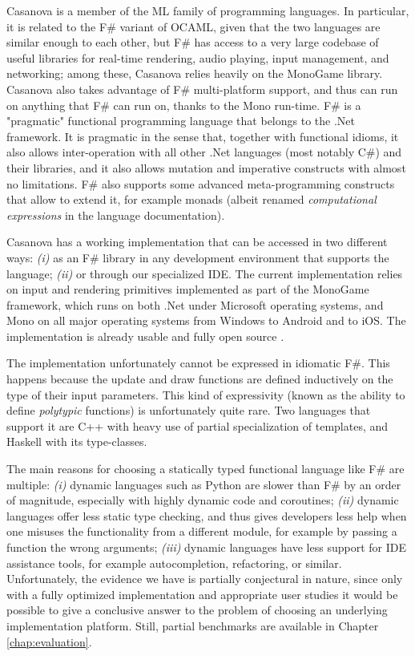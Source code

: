 Casanova is a member of the ML family of programming languages. In particular, it is related to the F\# variant of OCAML, given that the two languages are similar enough to each other, but F\# has access to a very large codebase of useful libraries for real-time rendering, audio playing, input management, and networking; among these, Casanova relies heavily on the MonoGame library. Casanova also takes advantage of F\# multi-platform support, and thus can run on anything that F\# can run on, thanks to the Mono run-time. F\# is a "pragmatic" functional programming language that belongs to the .Net framework. It is pragmatic in the sense that, together with functional idioms, it also allows inter-operation with all other .Net languages (most notably C\#) and their libraries, and it also allows mutation and imperative constructs with almost no limitations. F\# also supports some advanced meta-programming constructs that allow to extend it, for example monads (albeit renamed \textit{computational expressions} in the language documentation).

Casanova has a working implementation that can be accessed in two different ways: \textit{(i)} as an F\# library in any development environment that supports the language; \textit{(ii)} or through our specialized IDE. The current implementation relies on input and rendering primitives implemented as part of the MonoGame framework, which runs on both .Net under Microsoft operating systems, and Mono on all major operating systems from Windows to Android and to iOS. The implementation is already usable and fully open source \cite{CASANOVA_CODEPLEX}.

The implementation unfortunately cannot be expressed in idiomatic F\#. This happens because the update and draw functions are defined inductively on the type of their input parameters. This kind of expressivity (known as the ability to define \textit{polytypic} functions) is unfortunately quite rare. Two languages that support it are C++ with heavy use of partial specialization of templates, and Haskell with its type-classes. 

The main reasons for choosing a statically typed functional language like F\# are multiple: \textit{(i)} dynamic languages such as Python are slower than F\# by an order of magnitude, especially with highly dynamic code and coroutines; \textit{(ii)} dynamic languages offer less static type checking, and thus gives developers less help when one misuses the functionality from a different module, for example by passing a function the wrong arguments; \textit{(iii)} dynamic languages have less support for IDE assistance tools, for example autocompletion, refactoring, or similar. Unfortunately, the evidence we have is partially conjectural in nature, since only with a fully optimized implementation and appropriate user studies it would be possible to give a conclusive answer to the problem of choosing an underlying implementation platform. Still, partial benchmarks are available in Chapter \ref{chap:evaluation}.

